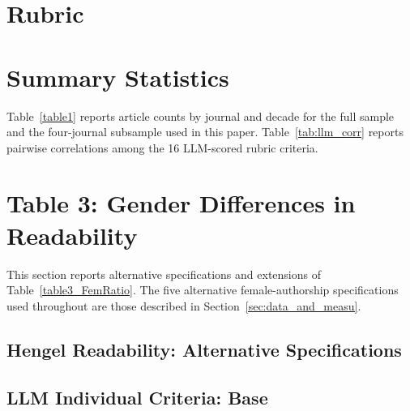 \section{Rubric}\label{sec:rubric}



\section{Summary Statistics}\label{sec:Summary Statistics}




Table~\ref{table1} reports article counts by journal and decade for the full \cite{hengel2022publishing} sample and the four-journal subsample used in this paper. Table~\ref{tab:llm_corr} reports pairwise correlations among the 16 LLM-scored rubric criteria.





\clearpage

\section{Table 3: Gender Differences in Readability}\label{app:sec:table3}

This section reports alternative specifications and extensions of Table~\ref{table3_FemRatio}. The five alternative female-authorship specifications used throughout are those described in Section~\ref{sec:data_and_measu}.

\subsection{Hengel Readability: Alternative Specifications}\label{app:sec:readability_robust}







\clearpage

\subsection{LLM Individual Criteria: Base}\label{app:sec:reg}




\clearpage

